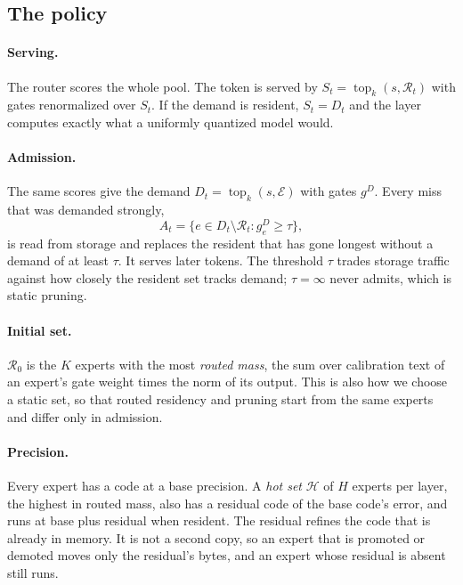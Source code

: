 \documentclass[11pt]{article}
\newcommand{\pool}{\mathcal{E}}
\newcommand{\res}{\mathcal{R}}
\newcommand{\hot}{\mathcal{H}}
\newcommand{\topk}{\operatorname{top}_k}
\begin{document}
\subsection{The policy}

\paragraph{Serving.} The router scores the whole pool. The token is served by
$S_t=\topk(s,\res_t)$ with gates renormalized over $S_t$. If the demand is resident,
$S_t=D_t$ and the layer computes exactly what a uniformly quantized model would.

\paragraph{Admission.} The same scores give the demand $D_t=\topk(s,\pool)$ with gates $g^D$.
Every miss that was demanded strongly,
\begin{equation}
  A_t=\{e\in D_t\setminus\res_t : g^D_e\ge\tau\},
\end{equation}
is read from storage and replaces the resident that has gone longest without a demand of at
least $\tau$. It serves later
tokens. The threshold $\tau$ trades storage traffic against how closely the resident set tracks
demand; $\tau=\infty$ never admits, which is static pruning.

\paragraph{Initial set.} $\res_0$ is the $K$ experts with the most \emph{routed mass}, the sum over calibration text of an expert's gate weight times the norm of its output. This is also how we choose a static set, so that
routed residency and pruning start from the same experts and differ only in admission.

\paragraph{Precision.} Every expert has a code at a base precision. A \emph{hot set} $\hot$ of
$H$ experts per layer, the highest in routed mass, also has a residual code of the base code's
error, and runs at base plus residual when resident. The residual refines the code that is
already in memory. It is not a second copy, so an expert that is promoted or demoted moves only
the residual's bytes, and an expert whose residual is absent still runs.
\end{document}
